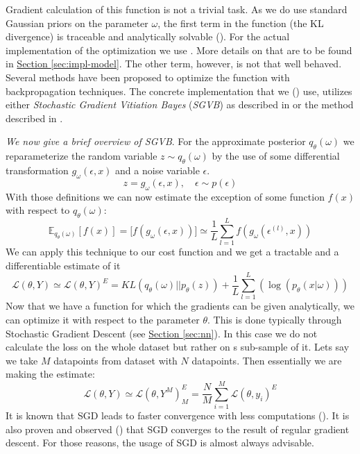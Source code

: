 \documentclass[12pt,a4paper,twoside]{scrartcl}
\numberwithin{equation}{section}
\newcommand{\refsec}[1]{\hyperref[#1]{Section \ref*{#1}}}
\begin{document}
Gradient calculation of this function is not a trivial task. As we do use standard Gaussian priors on the parameter \(\omega\), the first term in the function (the KL divergence) is traceable and analytically solvable (\cite{paisley2012}). For the actual implementation of the optimization we use \cite{tf}. More details on that are to be found in \refsec{sec:impl-model}. The other term, however, is not that well behaved. Several methods have been proposed to optimize the function with backpropagation techniques. The concrete implementation that we (\cite{edward}) use, utilizes either \emph{Stochastic Gradient Vitiation Bayes} (\emph{SGVB}) as described in \cite{kingma2013} or the method described in \cite{paisley2012}. 

\emph{We now give a brief overview of SGVB}. For the approximate posterior \(q_{\theta}(\omega)\) we reparameterize the random variable \(z \sim q_{\theta}(\omega)\) by the use of some differential transformation \(g_{\omega}(\epsilon , x)\) and a noise variable \(\epsilon\).
\begin{equation}
  z =  g_{\omega}(\epsilon , x), \quad \epsilon \sim p(\epsilon)
\end{equation}
With those definitions we can now estimate the exception of some function \(f(x)\) with respect to \(q_{\theta}(\omega)\):
\begin{equation}
  \mathbb{E}_{q_{\theta}(\omega)}[f(x)] = \mathbb[f(g_{\omega}(\epsilon , x))] \simeq \frac{1}{L}\sum_{l=1}^L f(g_{\omega}(\epsilon^{(l)} , x))
\end{equation}
We can apply this technique to our cost function and we get a tractable and a differentiable estimate of it
\begin{equation}
  \mathcal{L}(\theta, Y) \simeq \mathcal{L}(\theta,Y)^E = KL(q_{\theta}(\omega)||p_{\theta}(z))  + \frac{1}{L}\sum_{l=1}^L(\log(p_{\theta}(x|\omega)))
\end{equation}
Now that we have a function for which the gradients can be given analytically, we can optimize it with respect to the parameter \(\theta\). This is done typically through Stochastic Gradient Descent (see \refsec{sec:nn}). In this case we do not calculate the loss on the whole dataset but rather on s sub-sample of it. Lets say we take \(M\) datapoints from dataset with \(N\) datapoints. Then essentially we are making the estimate:
\begin{equation}
  \mathcal{L}(\theta, Y) \simeq \mathcal{L}(\theta, Y^M)^E_M = \frac{N}{M}  \sum_{i=1}^{M}\mathcal{L}(\theta, y_i)^E
\end{equation}
It is known that SGD leads to faster convergence with less computations (\cite{robbins1951}). It is also proven and observed (\cite{shapiro1996}) that SGD converges to the result of regular gradient descent. For those reasons, the usage of SGD is almost always advisable.
\end{document}
